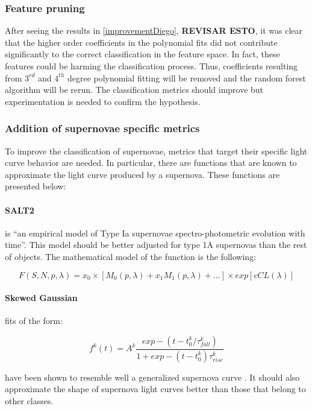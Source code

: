 \subsubsection{Feature pruning}

After seeing the results in \ref{improvementDiego}, \textbf{REVISAR ESTO}, it was clear that the higher order coefficients in the polynomial fits did not contribute significantly to the correct classification in the feature space. In fact, these features could be harming the classification process. Thus, coefficients resulting from $3^{rd}$ and $4^{th}$ degree polynomial fitting will be removed and the random forest algorithm will be rerun. The classification metrics should improve but experimentation is needed to confirm the hypothesis.  

\subsubsection{Addition of supernovae specific metrics}

To improve the classification of supernovae, metrics that target their specific light curve behavior are needed. In particular, there are functions that are known to approximate the light curve produced by a supernova. These functions are presented below: 

\paragraph{SALT2} is ``an empirical model of Type Ia supernovae spectro-photometric evolution with time''\cite{salt2}. This model should be better adjusted for type 1A supernovas than the rest of objects. The mathematical model of the function is the following\cite{salt2}:

\[
  F(S,N,p,\lambda) = x_0 \times [M_0(p,\lambda)+x_1M_1(p,\lambda)+...]\times exp[cCL(\lambda)]
\]

\paragraph{Skewed Gaussian} fits of the form:

\[f^k(t) = A^k \frac{exp-(t-t_0^k/\tau^k_{fall})}{1+exp-(t-t^k_0)\tau^k_{rise}}\]

have been shown to resemble well a generalized supernova curve \cite{sGaussian}. It should also approximate the shape of supernova light curves better than those that belong to other classes.\\

